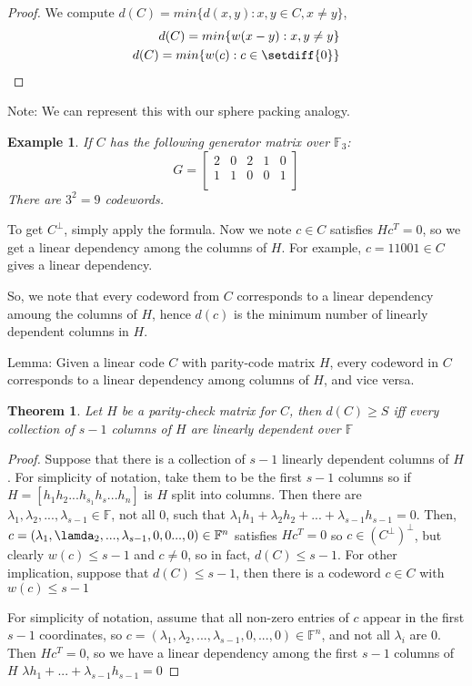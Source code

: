 \documentclass{article}
\newtheorem{thm}{Theorem}
\newtheorem{eg}{Example}
\begin{document}
\begin{proof}
    We compute $d(C) = min\{d(x,y): x,y\in C, x\ne y\}$,
    \begin{align*}
        d(C) = min\{w(x-y): x, y\ne y\}\\
        d(C) = min\{w(c): c\in \setdiff \{0\}\}\\
    \end{align*}
\end{proof}

Note: We can represent this with our sphere packing analogy.

\begin{eg}
    If $C$ has the following generator matrix over $\mathbb{F}_3$:
    \[
        G =
        \begin{bmatrix}
            2 & 0 & 2 & 1 & 0\\
            1 & 1 & 0 & 0 & 1\\
        \end{bmatrix}
    \]
    There are $3^2 = 9$ codewords.
\end{eg}
To get $C^{\perp}$, simply apply the formula. Now we note $c\in C$ satisfies
$Hc^T = 0$, so we get a linear dependency among the columns of $H$. For example,
$c = 11001\in C$ gives a linear dependency.

So, we note that every codeword from $C$ corresponds to a linear dependency amoung the
columns of $H$, hence $d(c)$ is the minimum number of linearly dependent columns in $H$.

Lemma: Given a linear code $C$ with parity-code matrix $H$, every codeword in $C$
corresponds to a linear dependency among columns of $H$, and vice versa.

\begin{thm}
    Let $H$ be a parity-check matrix for $C$, then $d(C)\geq S$ iff every collection of
    $s-1$ columns of $H$ are linearly dependent over $\mathbb{F}$
\end{thm}

\begin{proof}
    Suppose that there is a collection of $s-1$ linearly dependent columns of $H$.
    For simplicity of notation, take them to be the first $s-1$ columns so if
    $H = [h_1 h_2 ... h_{s_1} h_s ... h_n]$ is $H$ split into columns. Then there are
    $\lambda_1, \lambda_2, ..., \lambda_{s-1}\in\mathbb{F}$, not all 0, such that
    $\lambda_1h_1 + \lambda_2h_2 + ... + \lambda_{s-1}h_{s-1} = 0$.
    Then, $c = (\lambda_1, \lamda_2, ..., \lambda_{s-1}, 0, 0 ..., 0)\in\mathbb{F}^n$
    satisfies $Hc^{T} = 0$ so $c\in (C^{\perp})^{\perp}$, but clearly
    $w(c)\leq s-1$ and $c\ne 0$, so in fact, $d(C) \leq s-1$. For other implication,
    suppose that $d(C)\leq s-1$, then there is a codeword $c\in C$ with $w(c)\leq s-1$

    For simplicity of notation, assume that all non-zero entries of $c$ appear in the
    first $s-1$ coordinates, so $c = (\lambda_1, \lambda_2, ..., \lambda_{s-1}, 0, ..., 0)
    \in\mathbb{F}^n$, and not all $\lambda_i$ are 0. Then $Hc^T = 0$, so we have a linear
    dependency among the first $s-1$ columns of $H$
    $\lambda h_1 + ... + \lambda_{s-1}h_{s-1} = 0$
\end{proof}
\end{document}
